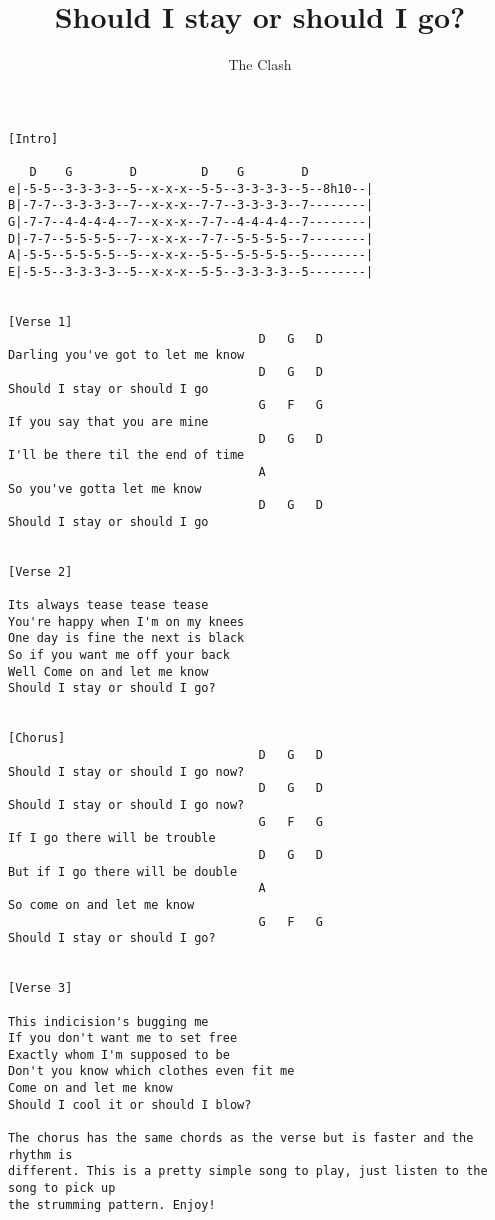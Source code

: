 \documentclass{article}%
\title{Should I stay or should I go?}
\date{}
\author{The Clash}
\begin{document}
\maketitle
\begin{verbatim}
[Intro]

   D    G        D         D    G        D
e|-5-5--3-3-3-3--5--x-x-x--5-5--3-3-3-3--5--8h10--|
B|-7-7--3-3-3-3--7--x-x-x--7-7--3-3-3-3--7--------|
G|-7-7--4-4-4-4--7--x-x-x--7-7--4-4-4-4--7--------|
D|-7-7--5-5-5-5--7--x-x-x--7-7--5-5-5-5--7--------|
A|-5-5--5-5-5-5--5--x-x-x--5-5--5-5-5-5--5--------|
E|-5-5--3-3-3-3--5--x-x-x--5-5--3-3-3-3--5--------|


[Verse 1]
                                   D   G   D
Darling you've got to let me know
                                   D   G   D
Should I stay or should I go
                                   G   F   G
If you say that you are mine
                                   D   G   D
I'll be there til the end of time
                                   A
So you've gotta let me know
                                   D   G   D
Should I stay or should I go


[Verse 2]

Its always tease tease tease
You're happy when I'm on my knees
One day is fine the next is black
So if you want me off your back
Well Come on and let me know
Should I stay or should I go?


[Chorus]
                                   D   G   D
Should I stay or should I go now?
                                   D   G   D
Should I stay or should I go now?
                                   G   F   G
If I go there will be trouble
                                   D   G   D
But if I go there will be double
                                   A
So come on and let me know
                                   G   F   G
Should I stay or should I go?


[Verse 3]

This indicision's bugging me
If you don't want me to set free
Exactly whom I'm supposed to be
Don't you know which clothes even fit me
Come on and let me know
Should I cool it or should I blow?

The chorus has the same chords as the verse but is faster and the rhythm is
different. This is a pretty simple song to play, just listen to the song to pick up
the strumming pattern. Enjoy!
\end{verbatim}
\end{document}

